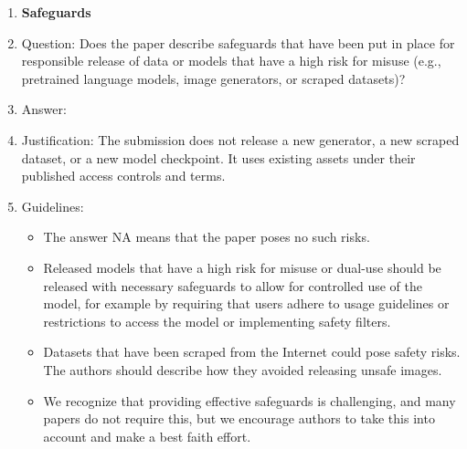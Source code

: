 \documentclass{article}
\begin{document}
\begin{enumerate}
\item {\bf Safeguards}
    \item[] Question: Does the paper describe safeguards that have been put in place for responsible release of data or models that have a high risk for misuse (e.g., pretrained language models, image generators, or scraped datasets)?
    \item[] Answer: \answerNA{}
    \item[] Justification: The submission does not release a new generator, a new scraped dataset, or a new model checkpoint. It uses existing assets under their published access controls and terms.
    \item[] Guidelines:
    \begin{itemize}
        \item The answer NA means that the paper poses no such risks.
        \item Released models that have a high risk for misuse or dual-use should be released with necessary safeguards to allow for controlled use of the model, for example by requiring that users adhere to usage guidelines or restrictions to access the model or implementing safety filters. 
        \item Datasets that have been scraped from the Internet could pose safety risks. The authors should describe how they avoided releasing unsafe images.
        \item We recognize that providing effective safeguards is challenging, and many papers do not require this, but we encourage authors to take this into account and make a best faith effort.
    \end{itemize}


\end{enumerate}
\end{document}
